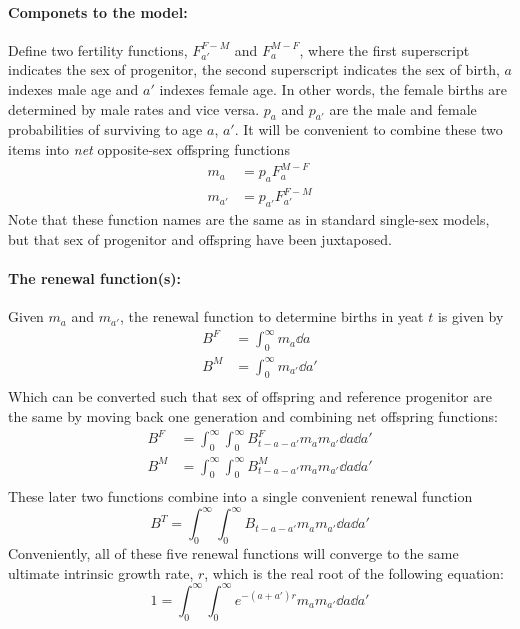 \label{sec:pollardage}
\paragraph{Componets to the model: }
Define two fertility functions, $F_{a'}^{F-M}$ and $F_a^{M-F}$, where the first
superscript indicates the sex of progenitor, the second superscript indicates
the sex of birth, $a$ indexes male age and $a'$ indexes female age. In
other words, the female births are determined by male rates and vice versa.
$p_a$ and $p_{a'}$ are the male and female probabilities of surviving to age 
$a$, $a'$. It will be convenient to combine these two items into \textit{net}
opposite-sex offspring functions
\begin{align}
m_a &= p_aF_a^{M-F}\\
m_{a'} &= p_{a'}F_{a'}^{F-M}
\end{align}
Note that these function names are the same as in standard single-sex models,
but that sex of progenitor and offspring have been juxtaposed.
\paragraph{The renewal function(s): }
Given $m_a$ and $m_{a'}$, the renewal function to determine births in yeat $t$
is given by
\begin{align}
B^F &= \int_0^\infty m_a \dd a\\
B^M &= \int_0^\infty m_{a'} \dd a'\\
\end{align}
Which can be converted such that sex of offspring and reference
progenitor are the same by moving back one generation and combining net
offspring functions:
\begin{align}
B^F &= \int_0^\infty \int_0^\infty B^F_{t-a-a'} m_am_{a'}\dd a \dd a'\\
B^M &= \int_0^\infty \int_0^\infty B^M_{t-a-a'} m_am_{a'}\dd a \dd a'\\
\end{align}
These later two functions combine into a single convenient renewal function
\begin{equation}
B^T = \int_0^\infty \int_0^\infty B_{t-a-a'}m_am_{a'}\dd a \dd a'
\end{equation}
Conveniently, all of these five renewal functions will converge to the same
ultimate intrinsic growth rate, $r$, which is the real root of the following equation: 
\begin{equation}
1 = \int_0^\infty \int_0^\infty e^{-(a+a')r}m_am_{a'}\dd a \dd a'
\end{equation}

